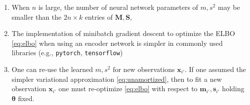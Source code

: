\documentclass[reqno,11pt]{amsart}
\newcommand\mm{\mathbf{M}}
\newcommand\ms{\mathbf{S}}
\newcommand\vm{\mathbf{m}}
\newcommand\vs{\mathbf{s}}
\newcommand\vtheta{\boldsymbol{\theta}}
\newcommand\vx{\mathbf{x}}
\begin{document}
\begin{enumerate}
\item When $n$ is large, the number of neural network parameters of $m, s^2$
  may be smaller than the $2n \times k$ entries of $\mm, \ms$,
\item The implementation of minibatch gradient descent to optimize the ELBO
  \eqref{eq:elbo} when using an encoder network is simpler in commonly used
  libraries (e.g., \texttt{pytorch}, \texttt{tensorflow})
\item One can re-use the learned $m, s^2$ for new observations $\vx_{i'}$. If
  one assumed the simpler variational approximation \eqref{eq:unamortized},
  then to fit a new observation $\vx_{i'}$ one must re-optimize \eqref{eq:elbo}
  with respect to $\vm_{i'}, \vs_{i'}$ holding $\vtheta$ fixed.
\end{enumerate}

\printbibliography
\end{document}
